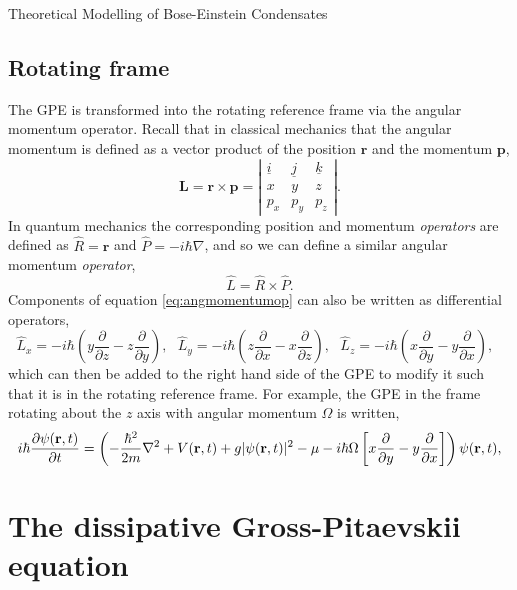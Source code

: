 \begin{chapter}{\label{cha:theoretical_model}Theoretical Modelling of Bose-Einstein Condensates}
	\subsection{\label{section:rotatingframe} Rotating frame}
	The GPE is transformed into the rotating reference frame via the angular momentum operator. Recall that in classical mechanics that the angular momentum is defined as a vector product of the position $\mathbf{r}$ and the momentum $\mathbf{p}$,
	\begin{equation*}
		\mathbf{L} = \mathbf{r} \times \mathbf{p} = 
		\left| \begin{array}{ccc}
\underline{i} & \underline{j} & \underline{k} \\
x & y & z \\
p_x & p_y & p_z \end{array} \right|.
	\end{equation*}
	In quantum mechanics the corresponding position and momentum {\it operators} are defined as $\hat{R} = \mathbf{r}$ and $\hat{P} = -i\hbar\nabla$, and so we can define a similar angular momentum {\it operator},
	\begin{equation}\label{eq:angmomentumop}
		\hat{L} = \hat{R} \times \hat{P}.
	\end{equation}
	Components of equation \ref{eq:angmomentumop} can also be written as differential operators,
	\begin{equation}
		\hat{L}_x = -i\hbar\left ( y \frac{\partial}{\partial z} - z \frac{\partial}{\partial y} \right ),~~~
		\hat{L}_y = -i\hbar\left ( z \frac{\partial}{\partial x} - x \frac{\partial}{\partial z} \right ),~~~
		\hat{L}_z = -i\hbar\left ( x \frac{\partial}{\partial y} - y \frac{\partial}{\partial x} \right ),~~~
	\end{equation}
 which can then be added to the right hand side of the GPE to modify it such that it is in the rotating reference frame. For example, the GPE in the frame rotating about the $z$ axis with angular momentum $\Omega$ is written,
	\begin{equation}\label{eq:rotframegpe}
	i\hbar \frac{\partial\psi({\bf r},t)}{\partial t} = \left(-\frac{\hbar^2}{2m}\nabla^2 + V({\bf r},t) + g|\psi({\bf r},t)|^2 - \mu -i\hbar\Omega\left [ x \frac{\partial}{\partial y} - y \frac{\partial}{\partial x} \right ] \right ) \psi({\bf r},t),
	\end{equation}


\section{\label{section:dgpe} The dissipative Gross-Pitaevskii equation}


\end{chapter}
